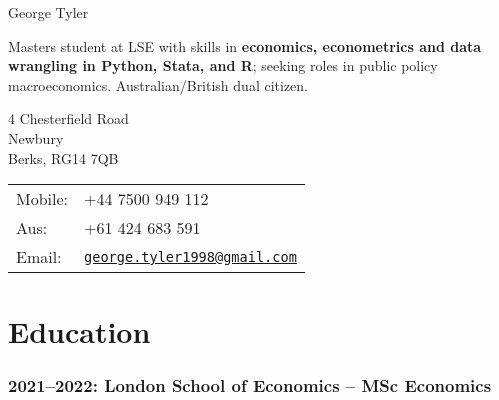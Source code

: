 \documentclass[a4]{article}
\def\name{George Tyler}
\renewenvironment{itemize}{
  \begin{list}{}{
    \setlength{\leftmargin}{1.5em}
  }
}{
  \end{list}
}
\begin{document}
{\huge \name}


\vspace{0.25in}

Masters student at LSE with skills in \textbf{economics, econometrics and data wrangling in Python, Stata, and R}; seeking roles in public policy macroeconomics. Australian/British dual citizen. 

\vspace{0.25in}

\begin{minipage}{0.45\linewidth}
  4 Chesterfield Road \\
  Newbury \\
  Berks, RG14 7QB
\end{minipage}
\begin{minipage}{0.45\linewidth}
  \begin{tabular}{ll}
    Mobile: & +44 7500 949 112 \\
    Aus: &  +61 424 683 591 \\
    Email: & \href{mailto:george.tyler1998@gmail.com}{\tt george.tyler1998@gmail.com} \\
  \end{tabular}
\end{minipage}





\section*{Education}
\subsubsection*{2021--2022: London School of Economics -- MSc Economics}
\end{document}
